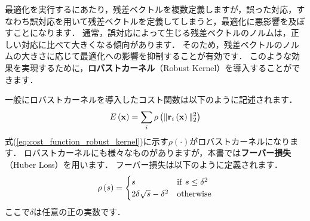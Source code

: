 最適化を実行するにあたり，残差ベクトルを複数定義しますが，誤った対応，すなわち誤対応を用いて残差ベクトルを定義してしまうと，最適化に悪影響を及ぼすことになります．
通常，誤対応によって生じる残差ベクトルのノルムは，正しい対応に比べて大きくなる傾向があります．
そのため，残差ベクトルのノルムの大きさに応じて最適化への影響を抑制することが有効です．
このような効果を実現するために，{\bf ロバストカーネル}（Robust Kernel）を導入することができます．

一般にロバストカーネルを導入したコスト関数は以下のように記述されます．
%
\begin{align}
  E \left( {\bf x} \right) = \sum_{i} \rho \left( \| {\bf r}_{i} \left( {\bf x} \right) \|_{2}^{2} \right)
  \label{eq:cost_function_robust_kernel}
\end{align}
%
式(\ref{eq:cost_function_robust_kernel})に示す$\rho \left( \cdot \right)$がロバストカーネルになります．
ロバストカーネルにも様々なものがありますが，本書では{\bf フーバー損失}（Huber Loss）を用います．
フーバー損失は以下のように定義されます．
%
\begin{align}
  \rho \left( s \right)
  =
  \begin{cases}
    s                                & {\rm if} ~ s \leq \delta^{2} \\
    2 \delta \sqrt{ s } - \delta^{2} & {\rm otherwise}
  \end{cases}
  \label{eq:huber_loss}
\end{align}
%
ここで$\delta$は任意の正の実数です．

